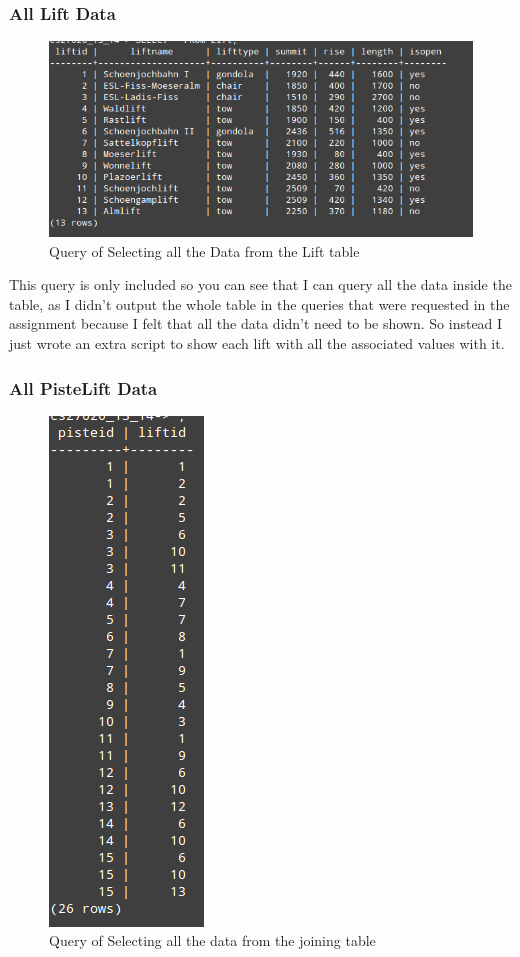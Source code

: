 \documentclass[12pt]{article}
\begin{document}
\subsubsection{All Lift Data}

\begin{figure}[htp]
\centering
\includegraphics[scale=0.5]{Screenshots/AllLift.png}
\caption{Query of Selecting all the Data from the Lift table}
\label{}
\end{figure}
This query is only included so you can see that I can query all the data inside the table, as I didn't output the whole table in the queries that were requested in the assignment because I felt that all the data didn't need to be shown. So instead I just wrote an extra script to show each lift with all the associated values with it.\subsubsection{All PisteLift Data}

\begin{figure}[htp]
\centering
\includegraphics[scale=0.45]{Screenshots/PisteLift.png}
\caption{Query of Selecting all the data from the joining table}
\label{}
\end{figure}
\end{document}
